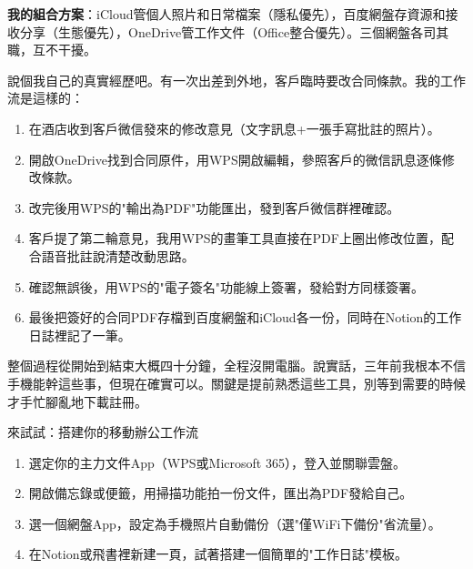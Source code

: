 \textbf{我的組合方案}：iCloud管個人照片和日常檔案（隱私優先），百度網盤存資源和接收分享（生態優先），OneDrive管工作文件（Office整合優先）。三個網盤各司其職，互不干擾。


說個我自己的真實經歷吧。有一次出差到外地，客戶臨時要改合同條款。我的工作流是這樣的：

\begin{enumerate}
  \item 在酒店收到客戶微信發來的修改意見（文字訊息+一張手寫批註的照片）。
  \item 開啟OneDrive找到合同原件，用WPS開啟編輯，參照客戶的微信訊息逐條修改條款。
  \item 改完後用WPS的"輸出為PDF"功能匯出，發到客戶微信群裡確認。
  \item 客戶提了第二輪意見，我用WPS的畫筆工具直接在PDF上圈出修改位置，配合語音批註說清楚改動思路。
  \item 確認無誤後，用WPS的"電子簽名"功能線上簽署，發給對方同樣簽署。
  \item 最後把簽好的合同PDF存檔到百度網盤和iCloud各一份，同時在Notion的工作日誌裡記了一筆。
\end{enumerate}

整個過程從開始到結束大概四十分鐘，全程沒開電腦。說實話，三年前我根本不信手機能幹這些事，但現在確實可以。關鍵是提前熟悉這些工具，別等到需要的時候才手忙腳亂地下載註冊。

\begin{tcbpractice}{來試試：搭建你的移動辦公工作流}
\begin{enumerate}
  \item 選定你的主力文件App（WPS或Microsoft 365），登入並關聯雲盤。
  \item 開啟備忘錄或便籤，用掃描功能拍一份文件，匯出為PDF發給自己。
  \item 選一個網盤App，設定為手機照片自動備份（選"僅WiFi下備份"省流量）。
  \item 在Notion或飛書裡新建一頁，試著搭建一個簡單的"工作日誌"模板。
\end{enumerate}

\end{tcbpractice}
